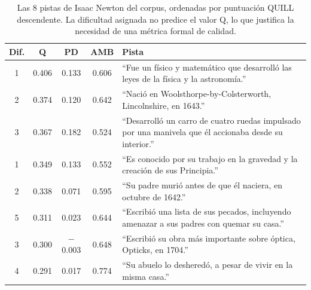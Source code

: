\documentclass[../main.tex]{subfiles}
\begin{document}
\begin{table}[H]
\centering
\begin{tabular}{ccccp{7cm}}
\hline
\textbf{Dif.} & \textbf{Q} & \textbf{PD} & \textbf{AMB} & \textbf{Pista} \\
\hline
1 & 0.406 & 0.133 & 0.606 & ``Fue un físico y matemático que desarrolló las leyes de la física y la astronomía.'' \\
2 & 0.374 & 0.120 & 0.642 & ``Nació en Woolsthorpe-by-Colsterworth, Lincolnshire, en 1643.'' \\
3 & 0.367 & 0.182 & 0.524 & ``Desarrolló un carro de cuatro ruedas impulsado por una manivela que él accionaba desde su interior.'' \\
1 & 0.349 & 0.133 & 0.552 & ``Es conocido por su trabajo en la gravedad y la creación de sus Principia.'' \\
2 & 0.338 & 0.071 & 0.595 & ``Su padre murió antes de que él naciera, en octubre de 1642.'' \\
5 & 0.311 & 0.023 & 0.644 & ``Escribió una lista de sus pecados, incluyendo amenazar a sus padres con quemar su casa.'' \\
3 & 0.300 & $-$0.003 & 0.648 & ``Escribió su obra más importante sobre óptica, Opticks, en 1704.'' \\
4 & 0.291 & 0.017 & 0.774 & ``Su abuelo lo desheredó, a pesar de vivir en la misma casa.'' \\
\hline
\end{tabular}
\caption{Las 8 pistas de Isaac Newton del corpus, ordenadas por puntuación QUILL descendente. La dificultad asignada no predice el valor Q, lo que justifica la necesidad de una métrica formal de calidad.}
\label{tab:newton_quill}
\end{table}
\end{document}
